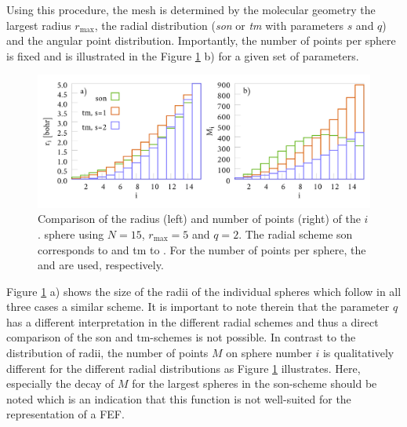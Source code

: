 Using this procedure, the mesh is determined by the molecular geometry the largest radius $r_\text{max}$, the radial distribution (\textit{son} or \textit{tm} with parameters $s$ and $q$) and the angular point distribution.
Importantly, the number of points per sphere is fixed and is illustrated in the Figure \ref{fig:maps} b) for a given set of parameters.
\begin{figure}[h]
\includegraphics[width=\textwidth]{Data/radial_mapping}
\caption{Comparison of the radius (left) and number of points (right) of the $i$. sphere using $N=15$, $r_\text{max}=5$ and $q=2$.
The radial scheme son corresponds to  and  tm to .
For the number of points per sphere, the  and  are used, respectively.}
\label{fig:maps}
\end{figure}
Figure \ref{fig:maps} a) shows the size of the radii of the individual spheres which follow in all three cases a similar scheme.
It is important to note therein that the parameter $q$ has a different interpretation in the different radial schemes and thus a direct comparison of the son and tm-schemes is not possible.
In contrast to the distribution of radii, the number of points $M$ on sphere number $i$ is qualitatively different for the different radial distributions as Figure \ref{fig:maps} illustrates. 
Here, especially the decay of $M$ for the largest spheres in the son-scheme should be noted which is an indication that this function is not well-suited for the representation of a FEF.

